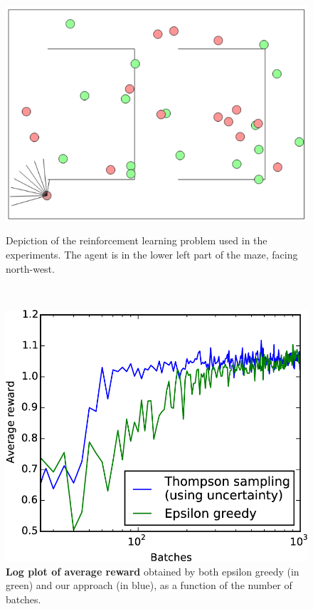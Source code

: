 \documentclass{article}
\theoremstyle{definition}
\begin{document}
\begin{figure}[b!]
\vspace{-4mm}
	\begin{minipage}{0.5\linewidth}
		\vspace{0mm}
		\includegraphics[width=\linewidth]{figs/exp3/rl_screenshot}
		
		\vspace{1mm}
		\caption{Depiction of the reinforcement learning problem used in the experiments. The agent is in the lower left part of the maze, facing north-west.} \label{fig:rl_depict}
	\end{minipage}~~~
	\begin{minipage}{0.5\linewidth}
		\vspace{2mm}
		\includegraphics[width=\linewidth]{figs/exp3/rl_plot.png}
		\vspace{-9mm}
		\caption{\textbf{Log plot of average reward} obtained by both epsilon greedy (in green) and our approach (in blue), as a function of the number of batches.} \label{fig:rl_plot}
	\end{minipage}
\end{figure}
\end{document}
